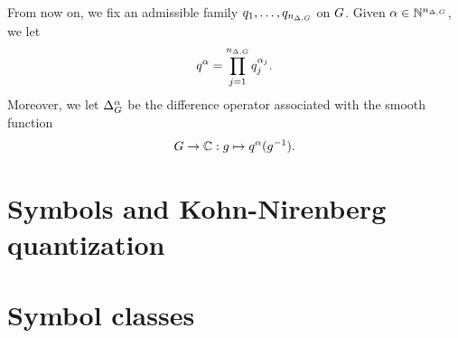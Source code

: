 \begin{remark}
    From now on, we fix an admissible family $q_1, \dots, q_{{n_{\Delta, G}}}$ on $G$.
    Given $\alpha \in \mathbb{N}^{{n_{\Delta, G}}}$, we let
    \begin{align*}
        q^\alpha = \prod_{j = 1}^{{n_{\Delta, G}}} q_j^{\alpha_j}.
    \end{align*}
    Moreover, we let ${\Delta_{G}^{\alpha}}$ be the difference operator associated with the smooth function
    \begin{align*}
        G \to \mathbb{C} : g \mapsto q^\alpha(g^{-1}).
    \end{align*}
\end{remark}

\section{Symbols and Kohn-Nirenberg quantization}

\section{Symbol classes}

